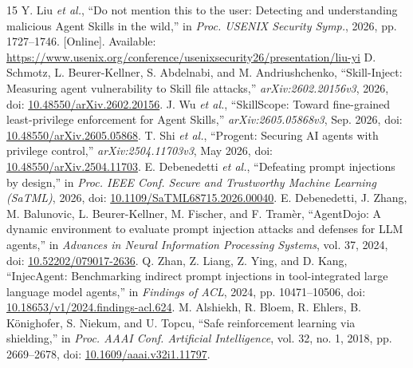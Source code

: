 \begin{thebibliography}{15}
 Y. Liu \emph{et al.}, ``Do not mention this to the user: Detecting and understanding malicious Agent Skills in the wild,'' in \emph{Proc. USENIX Security Symp.}, 2026, pp. 1727--1746. [Online]. Available: \url{https://www.usenix.org/conference/usenixsecurity26/presentation/liu-yi}
 D. Schmotz, L. Beurer-Kellner, S. Abdelnabi, and M. Andriushchenko, ``Skill-Inject: Measuring agent vulnerability to Skill file attacks,'' \emph{arXiv:2602.20156v3}, 2026, doi: \href{https://doi.org/10.48550/arXiv.2602.20156}{10.48550/arXiv.2602.20156}.
 J. Wu \emph{et al.}, ``SkillScope: Toward fine-grained least-privilege enforcement for Agent Skills,'' \emph{arXiv:2605.05868v3}, Sep. 2026, doi: \href{https://doi.org/10.48550/arXiv.2605.05868}{10.48550/arXiv.2605.05868}.
 T. Shi \emph{et al.}, ``Progent: Securing AI agents with privilege control,'' \emph{arXiv:2504.11703v3}, May 2026, doi: \href{https://doi.org/10.48550/arXiv.2504.11703}{10.48550/arXiv.2504.11703}.
 E. Debenedetti \emph{et al.}, ``Defeating prompt injections by design,'' in \emph{Proc. IEEE Conf. Secure and Trustworthy Machine Learning (SaTML)}, 2026, doi: \href{https://doi.org/10.1109/SaTML68715.2026.00040}{10.1109/SaTML68715.2026.00040}.
 E. Debenedetti, J. Zhang, M. Balunovic, L. Beurer-Kellner, M. Fischer, and F. Tram\`er, ``AgentDojo: A dynamic environment to evaluate prompt injection attacks and defenses for LLM agents,'' in \emph{Advances in Neural Information Processing Systems}, vol. 37, 2024, doi: \href{https://doi.org/10.52202/079017-2636}{10.52202/079017-2636}.
 Q. Zhan, Z. Liang, Z. Ying, and D. Kang, ``InjecAgent: Benchmarking indirect prompt injections in tool-integrated large language model agents,'' in \emph{Findings of ACL}, 2024, pp. 10471--10506, doi: \href{https://doi.org/10.18653/v1/2024.findings-acl.624}{10.18653/v1/2024.findings-acl.624}.
 M. Alshiekh, R. Bloem, R. Ehlers, B. K\"onighofer, S. Niekum, and U. Topcu, ``Safe reinforcement learning via shielding,'' in \emph{Proc. AAAI Conf. Artificial Intelligence}, vol. 32, no. 1, 2018, pp. 2669--2678, doi: \href{https://doi.org/10.1609/aaai.v32i1.11797}{10.1609/aaai.v32i1.11797}.


\end{thebibliography}
